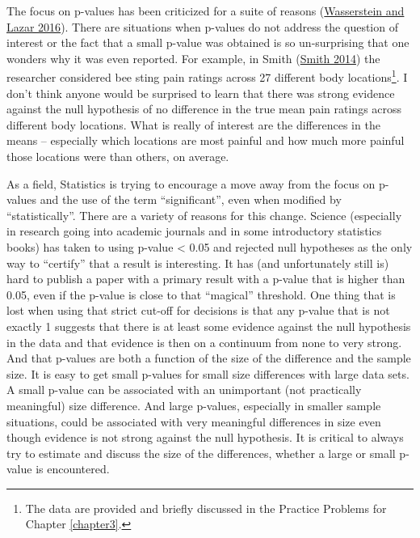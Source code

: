 \documentclass[
]{book}
\begin{document}

\indent The focus on p-values has been criticized for a suite of reasons (\protect\hyperlink{ref-Wasserstein2016}{Wasserstein and Lazar 2016}). There are situations when p-values do not address the question of interest or the fact that a small p-value was obtained is so un-surprising that one wonders why it was even reported. For example, in Smith (\protect\hyperlink{ref-Smith2014}{Smith 2014}) the researcher considered bee sting pain ratings across 27 different body locations\footnote{The data are provided and briefly discussed in the Practice Problems for Chapter \ref{chapter3}.}. I don't think anyone would be surprised to learn that there was strong evidence against the null hypothesis of no difference in the true mean pain ratings across different body locations. What is really of interest are the differences in the means -- especially which locations are most painful and how much more painful those locations were than others, on average.

\indent As a field, Statistics is trying to encourage a move away from the focus on p-values and the use of the term ``significant'', even when modified by ``statistically''. There are a variety of reasons for this change. Science (especially in research going into academic journals and in some introductory statistics books) has taken to using p-value \textless{} 0.05 and rejected null hypotheses as the only way to ``certify'' that a result is interesting. It has (and unfortunately still is) hard to publish a paper with a primary result with a p-value that is higher than 0.05, even if the p-value is close to that ``magical'' threshold. One thing that is lost when using that strict cut-off for decisions is that any p-value that is not exactly 1 suggests that there is at least some evidence against the null hypothesis in the data and that evidence is then on a continuum from none to very strong. And that p-values are both a function of the size of the difference and the sample size. It is easy to get small p-values for small size differences with large data sets. A small p-value can be associated with an unimportant (not practically meaningful) size difference. And large p-values, especially in smaller sample situations, could be associated with very meaningful differences in size even though evidence is not strong against the null hypothesis. It is critical to always try to estimate and discuss the size of the differences, whether a large or small p-value is encountered.
\end{document}
